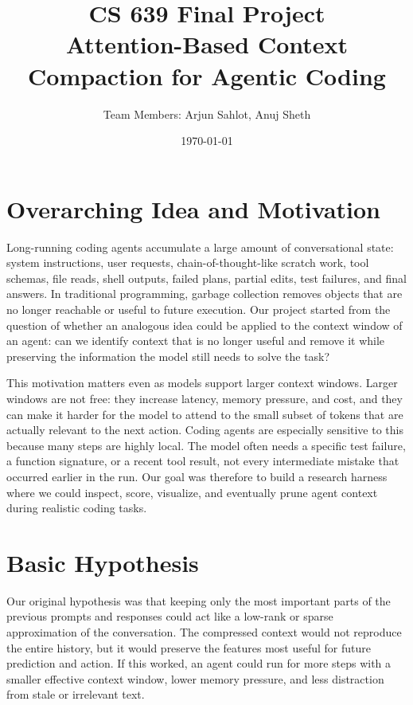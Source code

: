 \documentclass[11pt]{article}
\title{\vspace{-1.5cm}\textbf{CS 639 Final Project}\\
\large Attention-Based Context Compaction for Agentic Coding}
\author{Team Members: Arjun Sahlot, Anuj Sheth}
\date{\today}
\begin{document}
\maketitle
\vspace{-0.5cm}

\section*{Overarching Idea and Motivation}

Long-running coding agents accumulate a large amount of conversational state:
system instructions, user requests, chain-of-thought-like scratch work, tool
schemas, file reads, shell outputs, failed plans, partial edits, test failures,
and final answers. In traditional programming, garbage collection removes
objects that are no longer reachable or useful to future execution. Our project
started from the question of whether an analogous idea could be applied to the
context window of an agent: can we identify context that is no longer useful and
remove it while preserving the information the model still needs to solve the
task?

This motivation matters even as models support larger context windows. Larger
windows are not free: they increase latency, memory pressure, and cost, and they
can make it harder for the model to attend to the small subset of tokens that are
actually relevant to the next action. Coding agents are especially sensitive to
this because many steps are highly local. The model often needs a specific test
failure, a function signature, or a recent tool result, not every intermediate
mistake that occurred earlier in the run. Our goal was therefore to build a
research harness where we could inspect, score, visualize, and eventually prune
agent context during realistic coding tasks.

\section*{Basic Hypothesis}

Our original hypothesis was that keeping only the most important parts of the
previous prompts and responses could act like a low-rank or sparse approximation
of the conversation. The compressed context would not reproduce the entire
history, but it would preserve the features most useful for future prediction
and action. If this worked, an agent could run for more steps with a smaller
effective context window, lower memory pressure, and less distraction from stale
or irrelevant text.
\end{document}
